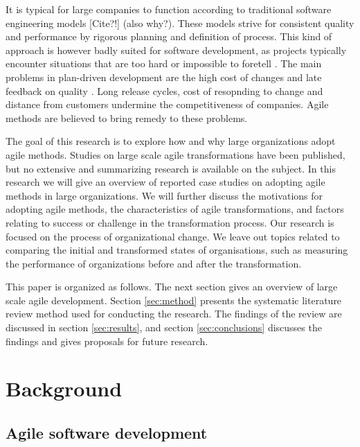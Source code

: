 \documentclass[lnbip]{svmultln}
\begin{document}
It is typical for large companies to function according to traditional software
engineering models [Cite?!] (also why?). These models strive for consistent quality and performance
by rigorous planning and definition of process. This kind of approach is however
badly suited for software development, as projects typically encounter
situations that are too hard or impossible to foretell \cite{Schwaber2002}.
The main problems in plan-driven development are the high cost of changes and
late feedback on quality \cite{Petersen2010}. Long release cycles, cost of
resopnding to change and distance from customers undermine the  competitiveness
of companies. Agile methods are believed to bring remedy to these problems.

The goal of this research is to explore how and why large organizations adopt
agile methods. Studies on large scale agile transformations have been published,
but no extensive and summarizing research is available on the subject. In this
research we will give an overview of reported case studies on adopting agile
methods in large organizations. We will further discuss the motivations for
adopting agile methods, the characteristics of agile transformations, and
factors relating to success or challenge in the transformation process. Our
research is focused on the process of organizational change. We leave out topics
related to comparing the initial and transformed states of organisations, such
as measuring the performance of organizations before and after the
transformation.

This paper is organized as follows. The next section gives an overview of large
scale agile development. Section \ref{sec:method} presents the systematic
literature review method used for conducting the research. The findings of the
review are discussed in section \ref{sec:results}, and section
\ref{sec:conclusions} discusses the findings and gives proposals for future
research.


\section{Background}
\label{sec:background}


\lipsum[1]

\subsection{Agile software development}
\end{document}
